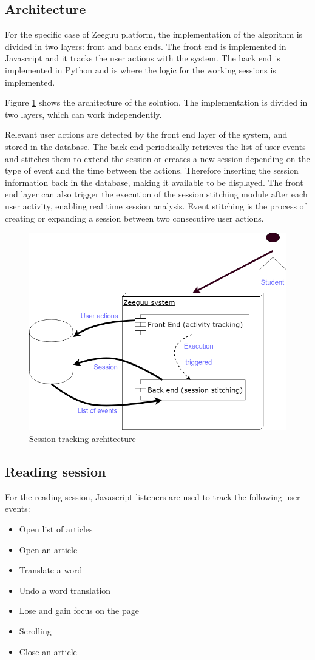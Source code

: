 \subsection{Architecture}
For the specific case of Zeeguu platform, the implementation of the algorithm is divided in two layers: front and back ends. The front end is implemented in Javascript and it tracks the user actions with the system. The back end is implemented in Python and is where the logic for the working sessions is implemented.

Figure \ref{fig:session_tracking_architecture} shows the architecture of the solution. The implementation is divided in two layers, which can work independently. 

Relevant user actions are detected by the front end layer of the system, and stored in the database. The back end periodically retrieves the list of user events and stitches them to extend the session or creates a new session depending on the type of event and the time between the actions. Therefore inserting the session information back in the database, making it available to be displayed.
The front end layer can also trigger the execution of the session stitching module after each user activity, enabling real time session analysis.
Event stitching is the process of creating or expanding a session between two consecutive user actions.

\begin{figure}[bth]
	\centering
	\includegraphics[width=0.7\linewidth]{gfx/session_tracking_architecture}
	\caption{Session tracking architecture}\label{fig:session_tracking_architecture}
\end{figure}

\subsection{Reading session}\label{p02:session_tracking_read_session}
For the reading session, Javascript listeners are used to track the following user events:
\begin{itemize}
	\item Open list of articles
	\item Open an article
	\item Translate a word
	\item Undo a word translation
	\item Lose and gain focus on the page
	\item Scrolling
	\item Close an article
\end{itemize}

